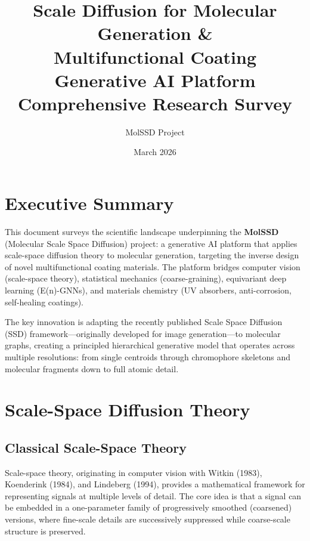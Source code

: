\documentclass[11pt,a4paper]{article}
\title{\textbf{Scale Diffusion for Molecular Generation \&\\
Multifunctional Coating Generative AI Platform}\\[6pt]
\large Comprehensive Research Survey}
\author{MolSSD Project}
\date{March 2026}
\begin{document}
\maketitle
\tableofcontents
\newpage

\section{Executive Summary}

This document surveys the scientific landscape underpinning the
\textbf{MolSSD} (Molecular Scale Space Diffusion) project: a generative AI
platform that applies scale-space diffusion theory to molecular generation,
targeting the inverse design of novel multifunctional coating materials.
The platform bridges computer vision (scale-space theory), statistical
mechanics (coarse-graining), equivariant deep learning (E(n)-GNNs), and
materials chemistry (UV absorbers, anti-corrosion, self-healing coatings).

The key innovation is adapting the recently published Scale Space Diffusion
(SSD) framework---originally developed for image generation---to molecular
graphs, creating a principled hierarchical generative model that operates
across multiple resolutions: from single centroids through chromophore
skeletons and molecular fragments down to full atomic detail.

\section{Scale-Space Diffusion Theory}

\subsection{Classical Scale-Space Theory}

Scale-space theory, originating in computer vision with Witkin (1983),
Koenderink (1984), and Lindeberg (1994), provides a mathematical framework
for representing signals at multiple levels of detail. The core idea is that
a signal can be embedded in a one-parameter family of progressively smoothed
(coarsened) versions, where fine-scale details are successively suppressed
while coarse-scale structure is preserved.
\end{document}
